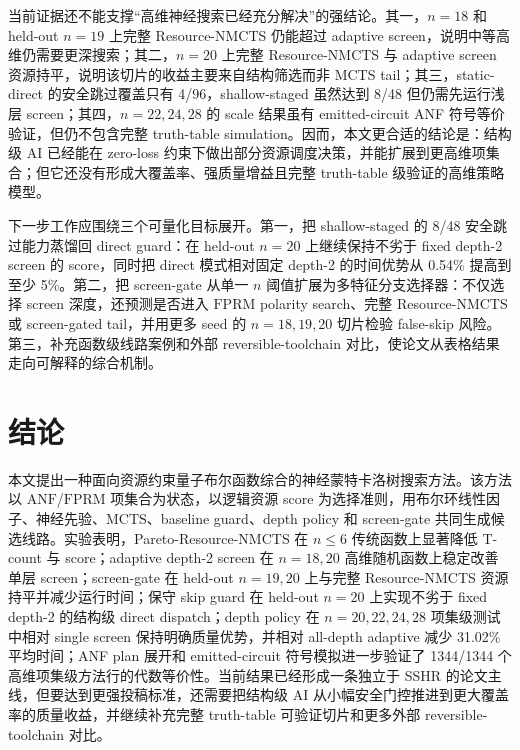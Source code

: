 \documentclass[UTF8,fontset=macnew,11pt]{ctexart}
\newcommand{\method}{Resource-NMCTS}
\newcommand{\pareto}{Pareto-Resource-NMCTS}
\newcommand{\anf}{\ensuremath{\mathrm{ANF}}}
\newcommand{\fprm}{\ensuremath{\mathrm{FPRM}}}
\newcommand{\mcts}{\ensuremath{\mathrm{MCTS}}}
\begin{document}
当前证据还不能支撑“高维神经搜索已经充分解决”的强结论。其一，$n=18$ 和 held-out $n=19$ 上完整 \method{} 仍能超过 adaptive screen，说明中等高维仍需要更深搜索；其二，$n=20$ 上完整 \method{} 与 adaptive screen 资源持平，说明该切片的收益主要来自结构筛选而非 MCTS tail；其三，static-direct 的安全跳过覆盖只有 4/96，shallow-staged 虽然达到 8/48 但仍需先运行浅层 screen；其四，$n=22,24,28$ 的 scale 结果虽有 emitted-circuit ANF 符号等价验证，但仍不包含完整 truth-table simulation。因而，本文更合适的结论是：结构级 AI 已经能在 zero-loss 约束下做出部分资源调度决策，并能扩展到更高维项集合；但它还没有形成大覆盖率、强质量增益且完整 truth-table 级验证的高维策略模型。

下一步工作应围绕三个可量化目标展开。第一，把 shallow-staged 的 8/48 安全跳过能力蒸馏回 direct guard：在 held-out $n=20$ 上继续保持不劣于 fixed depth-2 screen 的 score，同时把 direct 模式相对固定 depth-2 的时间优势从 0.54\% 提高到至少 5\%。第二，把 screen-gate 从单一 $n$ 阈值扩展为多特征分支选择器：不仅选择 screen 深度，还预测是否进入 \fprm{} polarity search、完整 \method{} 或 screen-gated tail，并用更多 seed 的 $n=18,19,20$ 切片检验 false-skip 风险。第三，补充函数级线路案例和外部 reversible-toolchain 对比，使论文从表格结果走向可解释的综合机制。

\section{结论}

本文提出一种面向资源约束量子布尔函数综合的神经蒙特卡洛树搜索方法。该方法以 \anf{}/\fprm{} 项集合为状态，以逻辑资源 score 为选择准则，用布尔环线性因子、神经先验、\mcts{}、baseline guard、depth policy 和 screen-gate 共同生成候选线路。实验表明，\pareto{} 在 $n\leq6$ 传统函数上显著降低 T-count 与 score；adaptive depth-2 screen 在 $n=18,20$ 高维随机函数上稳定改善单层 screen；screen-gate 在 held-out $n=19,20$ 上与完整 \method{} 资源持平并减少运行时间；保守 skip guard 在 held-out $n=20$ 上实现不劣于 fixed depth-2 的结构级 direct dispatch；depth policy 在 $n=20,22,24,28$ 项集级测试中相对 single screen 保持明确质量优势，并相对 all-depth adaptive 减少 31.02\% 平均时间；ANF plan 展开和 emitted-circuit 符号模拟进一步验证了 1344/1344 个高维项集级方法行的代数等价性。当前结果已经形成一条独立于 SSHR 的论文主线，但要达到更强投稿标准，还需要把结构级 AI 从小幅安全门控推进到更大覆盖率的质量收益，并继续补充完整 truth-table 可验证切片和更多外部 reversible-toolchain 对比。
\end{document}
